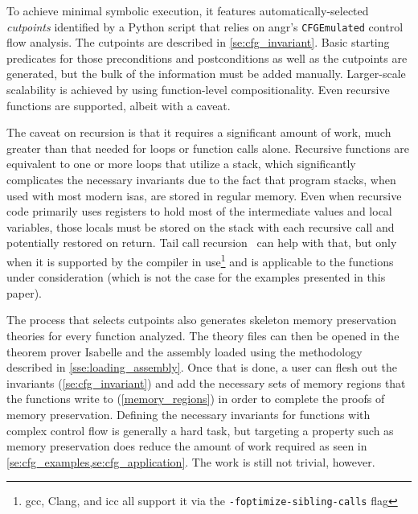 To achieve minimal symbolic execution,
it features automatically-selected \emph{cutpoints}%
identified by a Python script that relies on
angr's \lstinline|CFGEmulated| control flow analysis.%
The cutpoints are described in \cref{se:cfg_invariant}.
Basic starting predicates for those preconditions and postconditions%
%
as well as the cutpoints are generated,
but the bulk of the information must be added manually.
Larger-scale scalability is achieved by using function-level compositionality.
Even recursive functions are supported, albeit with a caveat.%

The caveat on recursion is that it requires a significant amount of work,
much greater than that needed for loops or function calls alone.
Recursive functions are equivalent to one or more loops that utilize a stack,
which significantly complicates the necessary invariants
due to the fact that program stacks, when used with most modern \acp{isa},
are stored in regular memory.
Even when recursive code primarily uses registers
to hold most of the intermediate values and local variables,
those locals must be stored on the stack with each recursive call%
and potentially restored on return.
Tail call recursion~\citep{clinger1998tail} can help with that,%
but only when it is supported by the compiler in use\footnote{%
  \acs{gcc}, Clang, and \acs{icc} all support it
  via the \texttt{-foptimize-sibling-calls} flag%
} and is applicable to the functions under consideration
(which is not the case for the examples presented in this paper).

The process that selects cutpoints%
also generates skeleton memory preservation theories for every function analyzed.
The theory files can then be opened in the theorem prover Isabelle
and the assembly loaded using the methodology described in \cref{sse:loading_assembly}.
Once that is done, a user can flesh out the invariants (\cref{se:cfg_invariant})%
and add the necessary sets of memory regions%
that the functions write to (\cref{memory_regions})
in order to complete the proofs of memory preservation.%
Defining the necessary invariants for functions with complex control flow
is generally a hard task,
but targeting a property such as memory preservation
does reduce the amount of work required
as seen in \cref{se:cfg_examples,se:cfg_application}.
The work is still not trivial, however.

